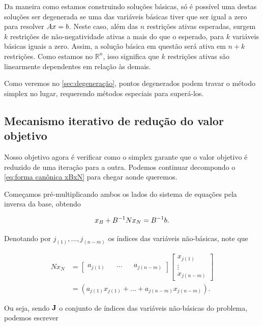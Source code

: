 Da maneira como estamos construindo soluções básicas, só é possível uma destas soluções ser degenerada se uma das variáveis básicas tiver que ser igual a zero para resolver $Ax = b$. Neste caso, além das $n$ restrições ativas esperadas, surgem $k$ restrições de não-negatividade ativas a mais do que o esperado, para $k$ variáveis básicas iguais a zero. Assim, a solução básica em questão será ativa em $n + k$ restrições. Como estamos no $\mathbb{R}^n$, isso significa que $k$ restrições ativas são linearmente dependentes em relação às demais.

Como veremos no \cref{sec:degeneração}, pontos degenerados podem travar o método simplex no lugar, requerendo métodos especiais para superá-los.

\subsection{Mecanismo iterativo de redução do valor objetivo}\label{sec:mecanismo simplex}

Nosso objetivo agora é verificar como o simplex garante que o valor objetivo é reduzido de uma iteração para a outra. Podemos continuar decompondo o \cref{eq:forma canônica xBxN} para chegar aonde queremos.

Começamos pré-multiplicando ambos os lados do sistema de equações pela inversa da base, obtendo

\begin{equation}\label{eq:vezes inversa}
      x_B + B^{-1} N  x_N = B^{-1}b.
\end{equation}

Denotando por $j_{(1)},\ldots,j_{(n-m)}$ os índices das variáveis não-básicas, note que

\begin{align}
     N  x_N &=
    \begin{bmatrix}
    a_{j(1)} && \ldots && a_{j(n-m)}
    \end{bmatrix}
    \begin{bmatrix}
        x_{j(1)}\\
        \vdots\\
        x_{j(n-m)}
    \end{bmatrix}\\
    &= (a_{j(1)}x_{j(1)} + \dots + a_{j(n-m)}x_{j(n-m)}).
\end{align}

Ou seja, sendo $ \vb J$ o conjunto de índices das variáveis não-básicas do problema, podemos escrever


